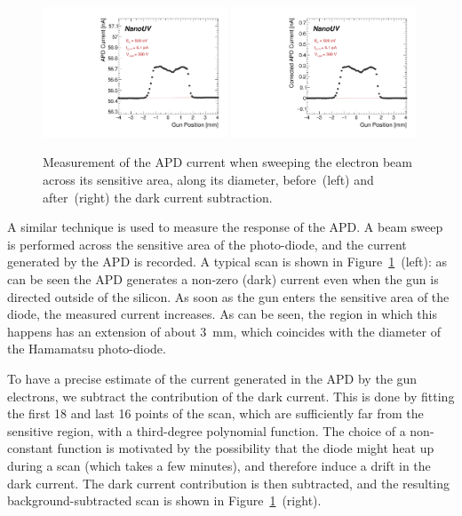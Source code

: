 \documentclass[12p]{paper}
\begin{document}
\begin{figure}[tb]
  \centering
\includegraphics[width=0.49\textwidth]{figures/scanAPD.pdf}
\includegraphics[width=0.49\textwidth]{figures/scanAPD_corr.pdf}
 \caption{Measurement of the APD current when sweeping the electron beam across its sensitive area, along its diameter, before~(left) and after~(right) the dark current subtraction.
  \label{fig:apd_scan}}
\end{figure}

A similar technique is used to measure the response of the APD. A beam sweep is performed across the sensitive area of the photo-diode, and the current generated by the APD is recorded. A typical scan is shown in Figure~\ref{fig:apd_scan}~(left): as can be seen the APD generates a non-zero (dark) current even when the gun is directed outside of the silicon. As soon as the gun enters the sensitive area of the diode, the measured current increases. As can be seen, the region in which this happens has an extension of about 3~mm, which coincides with the diameter of the Hamamatsu photo-diode.

To have a precise estimate of the current generated in the APD by the gun electrons, we subtract the contribution of the dark current. This is done by fitting the first 18 and last 16 points of the scan, which are sufficiently far from the sensitive region, with a third-degree polynomial function. The choice of a non-constant function is motivated by the possibility that the diode might heat up during a scan (which takes a few minutes), and therefore induce a drift in the dark current. The dark current contribution is then subtracted, and the resulting background-subtracted scan is shown in Figure~\ref{fig:apd_scan}~(right).
\end{document}
